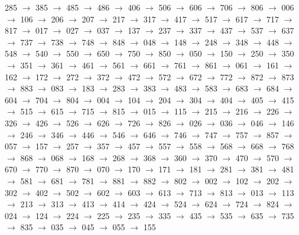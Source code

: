 285 $\rightarrow$ 385 $\rightarrow$ 485 $\rightarrow$ 486 $\rightarrow$ 406 $\rightarrow$ 506 $\rightarrow$ 606 $\rightarrow$ 706 $\rightarrow$ 806 $\rightarrow$ 006 $\rightarrow$ 106 $\rightarrow$ 206 $\rightarrow$ 207 $\rightarrow$ 217 $\rightarrow$ 317 $\rightarrow$ 417 $\rightarrow$ 517 $\rightarrow$ 617 $\rightarrow$ 717 $\rightarrow$ 817 $\rightarrow$ 017 $\rightarrow$ 027 $\rightarrow$ 037 $\rightarrow$ 137 $\rightarrow$ 237 $\rightarrow$ 337 $\rightarrow$ 437 $\rightarrow$ 537 $\rightarrow$ 637 $\rightarrow$ 737 $\rightarrow$ 738 $\rightarrow$ 748 $\rightarrow$ 848 $\rightarrow$ 048 $\rightarrow$ 148 $\rightarrow$ 248 $\rightarrow$ 348 $\rightarrow$ 448 $\rightarrow$ 548 $\rightarrow$ 540 $\rightarrow$ 550 $\rightarrow$ 650 $\rightarrow$ 750 $\rightarrow$ 850 $\rightarrow$ 050 $\rightarrow$ 150 $\rightarrow$ 250 $\rightarrow$ 350 $\rightarrow$ 351 $\rightarrow$ 361 $\rightarrow$ 461 $\rightarrow$ 561 $\rightarrow$ 661 $\rightarrow$ 761 $\rightarrow$ 861 $\rightarrow$ 061 $\rightarrow$ 161 $\rightarrow$ 162 $\rightarrow$ 172 $\rightarrow$ 272 $\rightarrow$ 372 $\rightarrow$ 472 $\rightarrow$ 572 $\rightarrow$ 672 $\rightarrow$ 772 $\rightarrow$ 872 $\rightarrow$ 873 $\rightarrow$ 883 $\rightarrow$ 083 $\rightarrow$ 183 $\rightarrow$ 283 $\rightarrow$ 383 $\rightarrow$ 483 $\rightarrow$ 583 $\rightarrow$ 683 $\rightarrow$ 684 $\rightarrow$ 604 $\rightarrow$ 704 $\rightarrow$ 804 $\rightarrow$ 004 $\rightarrow$ 104 $\rightarrow$ 204 $\rightarrow$ 304 $\rightarrow$ 404 $\rightarrow$ 405 $\rightarrow$ 415 $\rightarrow$ 515 $\rightarrow$ 615 $\rightarrow$ 715 $\rightarrow$ 815 $\rightarrow$ 015 $\rightarrow$ 115 $\rightarrow$ 215 $\rightarrow$ 216 $\rightarrow$ 226 $\rightarrow$ 326 $\rightarrow$ 426 $\rightarrow$ 526 $\rightarrow$ 626 $\rightarrow$ 726 $\rightarrow$ 826 $\rightarrow$ 026 $\rightarrow$ 036 $\rightarrow$ 046 $\rightarrow$ 146 $\rightarrow$ 246 $\rightarrow$ 346 $\rightarrow$ 446 $\rightarrow$ 546 $\rightarrow$ 646 $\rightarrow$ 746 $\rightarrow$ 747 $\rightarrow$ 757 $\rightarrow$ 857 $\rightarrow$ 057 $\rightarrow$ 157 $\rightarrow$ 257 $\rightarrow$ 357 $\rightarrow$ 457 $\rightarrow$ 557 $\rightarrow$ 558 $\rightarrow$ 568 $\rightarrow$ 668 $\rightarrow$ 768 $\rightarrow$ 868 $\rightarrow$ 068 $\rightarrow$ 168 $\rightarrow$ 268 $\rightarrow$ 368 $\rightarrow$ 360 $\rightarrow$ 370 $\rightarrow$ 470 $\rightarrow$ 570 $\rightarrow$ 670 $\rightarrow$ 770 $\rightarrow$ 870 $\rightarrow$ 070 $\rightarrow$ 170 $\rightarrow$ 171 $\rightarrow$ 181 $\rightarrow$ 281 $\rightarrow$ 381 $\rightarrow$ 481 $\rightarrow$ 581 $\rightarrow$ 681 $\rightarrow$ 781 $\rightarrow$ 881 $\rightarrow$ 882 $\rightarrow$ 802 $\rightarrow$ 002 $\rightarrow$ 102 $\rightarrow$ 202 $\rightarrow$ 302 $\rightarrow$ 402 $\rightarrow$ 502 $\rightarrow$ 602 $\rightarrow$ 603 $\rightarrow$ 613 $\rightarrow$ 713 $\rightarrow$ 813 $\rightarrow$ 013 $\rightarrow$ 113 $\rightarrow$ 213 $\rightarrow$ 313 $\rightarrow$ 413 $\rightarrow$ 414 $\rightarrow$ 424 $\rightarrow$ 524 $\rightarrow$ 624 $\rightarrow$ 724 $\rightarrow$ 824 $\rightarrow$ 024 $\rightarrow$ 124 $\rightarrow$ 224 $\rightarrow$ 225 $\rightarrow$ 235 $\rightarrow$ 335 $\rightarrow$ 435 $\rightarrow$ 535 $\rightarrow$ 635 $\rightarrow$ 735 $\rightarrow$ 835 $\rightarrow$ 035 $\rightarrow$ 045 $\rightarrow$ 055 $\rightarrow$ 155 